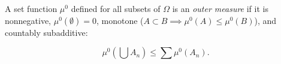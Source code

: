 A set function $\mu^0$ defined for all subsets of $\Omega$ is an \textit{outer measure} if it is nonnegative, $\mu^0(\emptyset) = 0$, monotone ($A \subset B \implies \mu^0(A) \leq \mu^0(B)$), and countably subadditive:

$$\mu^0\left(\bigcup A_n\right) \leq \sum \mu^0(A_n).$$
